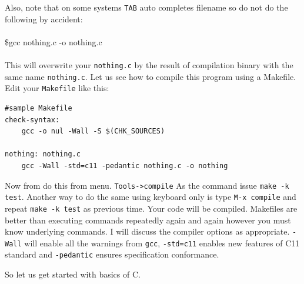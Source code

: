 \color{nicered}
\dangersign[3ex] Also, note that on some systems \texttt{TAB} auto completes filename so do
not do the following by accident:
\\\\\$gcc nothing.c -o nothing.c\\\\
\color{black}
This will overwrite your \texttt{nothing.c} by the result of compilation binary
with the same name \texttt{nothing.c}. Let us see how to compile this program
using a Makefile. Edit your \texttt{Makefile} like this:

\begin{verbatim}
#sample Makefile
check-syntax:
    gcc -o nul -Wall -S $(CHK_SOURCES)

nothing: nothing.c
    gcc -Wall -std=c11 -pedantic nothing.c -o nothing
\end{verbatim}

Now from do this from menu. \texttt{Tools->compile} As the command issue
\texttt{make -k test}. Another way to do the same using keyboard only is type
\texttt{M-x compile} and repeat \texttt{make -k test} as previous time. Your
code will be compiled. Makefiles are better than executing commands 
repeatedly again and again however you must know underlying commands. I will
discuss the compiler options as appropriate. \texttt{-Wall} will enable all the
warnings from \texttt{gcc}, \texttt{-std=c11} enables new features of C11
standard and \texttt{-pedantic} ensures specification conformance. 

So let us get started with basics of C.
